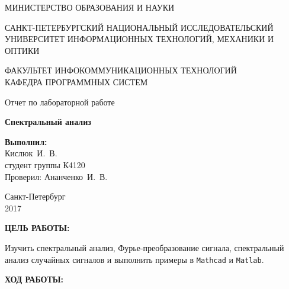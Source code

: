 \documentclass[14pt,a4paper]{extreport}
\newcommand{\header}[1]{%
{
\clearpage%
\fontsize{16pt}{14pt}\selectfont
\begin{center}
\textbf{\MakeUppercase{#1}:}
\end{center}
}
}
\newcommand{\labyear}{2017}
\newcommand{\labtitle}{Спектральный анализ}
\newcommand{\prepod}{Ананченко~И.~В.}
\newcommand{\student}{Кислюк~И.~В.}
\newcommand{\mathcad}{\texttt{Mathcad}}
\newcommand{\matlab}{\texttt{Matlab}}
\begin{document}
	\begin{titlepage}
	\begin{center}	
		\fontsize{14pt}{14pt}\selectfont
		МИНИСТЕРСТВО ОБРАЗОВАНИЯ И НАУКИ\\

		\vspace*{0.6\baselineskip}

		\MakeUppercase{Санкт-Петербургский Национальный Исследовательский Университет Информационных технологий, механики и оптики}		
		
		\vspace*{0.6\baselineskip}
		\MakeUppercase{Факультет Инфокоммуникационных технологий}\\
		\MakeUppercase{Кафедра программных систем}
	
		\vspace*{7\baselineskip}
		\fontsize{19pt}{18pt}\selectfont
		Отчет по лабораторной работе
		
		\fontsize{20pt}{18pt}\selectfont
		\textbf{\labtitle}\\
		\vspace*{1.15\baselineskip}
		\end{center}
	
	\vspace*{2\baselineskip}
	\begin{flushright}
	\fontsize{14pt}{14pt}\selectfont
	\textbf{Выполнил:}\\
	\student\\
	студент группы К4120\\
	Проверил: \prepod\\
	\end{flushright}
	
	\vspace{\fill}
	\begin{center}
	Санкт-Петербург\\
	\vspace{-1ex}
	\labyear
	\end{center}
	
\end{titlepage}

\fontsize{14pt}{14pt}\selectfont

\header{Цель работы}

Изучить спектральный анализ, Фурье-преобразование сигнала, спектральный анализ случайных сигналов и выполнить примеры в \mathcad{} и \matlab{}.

\header{Ход работы}
\end{document}
